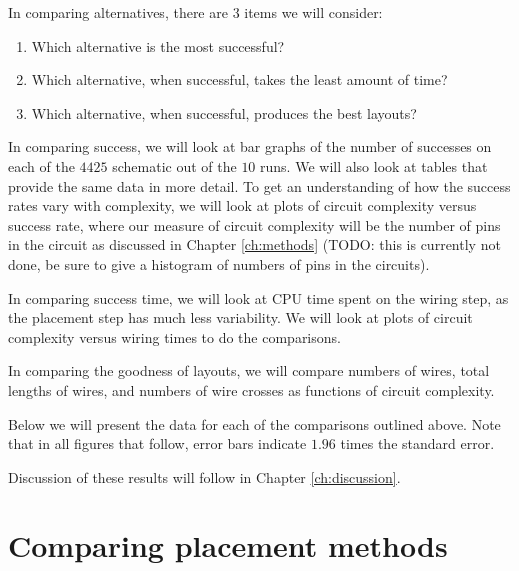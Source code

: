 In comparing alternatives, there are $3$ items we will consider:
\begin{enumerate}
\item Which alternative is the most successful?
\item Which alternative, when successful, takes the least amount of time?
\item Which alternative, when successful, produces the best layouts?
\end{enumerate}

In comparing success, we will look at bar graphs of the number of successes on
each of the $4425$ schematic out of the $10$ runs. We will also look at tables
that provide the same data in more detail. To get an understanding of how the
success rates vary with complexity, we will look at plots of circuit complexity
versus success rate, where our measure of circuit complexity will be the number
of pins in the circuit as discussed in Chapter \ref{ch:methods} (TODO: this is
currently not done, be sure to give a histogram of numbers of pins in the
circuits).

In comparing success time, we will look at CPU time spent on the wiring step, as
the placement step has much less variability. We will look at plots of circuit
complexity versus wiring times to do the comparisons.

In comparing the goodness of layouts, we will compare numbers of wires, total
lengths of wires, and numbers of wire crosses as functions of circuit complexity.

Below we will present the data for each of the comparisons outlined above. Note
that in all figures that follow, error bars indicate $1.96$ times the
standard error.

Discussion of these results will follow in Chapter \ref{ch:discussion}.

\section{Comparing placement methods}
\label{sec:compare_placement}

